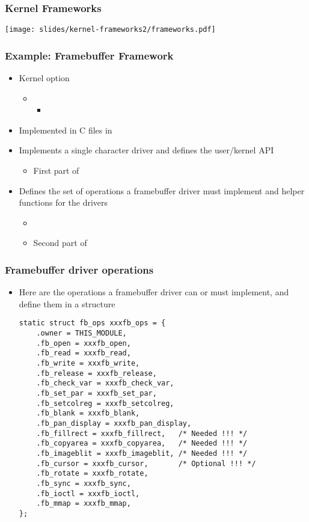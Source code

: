 \begin{frame}
  \frametitle{Kernel Frameworks}
  \begin{center}
    \texttt{[image: slides/kernel-frameworks2/frameworks.pdf]}
  \end{center}
\end{frame}

\begin{frame}
  \frametitle{Example: Framebuffer Framework}
  \begin{itemize}
  \item Kernel option 
    \begin{itemize}
    \item {}
      \begin{itemize}
      \item {}
      \end{itemize}
    \end{itemize}
  \item Implemented in C files in 
  \item Implements a single character driver and defines the
    user/kernel API
    \begin{itemize}
    \item First part of 
    \end{itemize}
  \item Defines the set of operations a framebuffer driver must
    implement and helper functions for the drivers
    \begin{itemize}
    \item {}
    \item Second part of 
    \end{itemize}
  \end{itemize}
\end{frame}

\begin{frame}[fragile]
  \frametitle{Framebuffer driver operations}
  \begin{itemize}
  \item Here are the operations a framebuffer driver can or must
  implement, and define them in a  structure
  \begin{verbatim}
static struct fb_ops xxxfb_ops = {
    .owner = THIS_MODULE,
    .fb_open = xxxfb_open,
    .fb_read = xxxfb_read,
    .fb_write = xxxfb_write,
    .fb_release = xxxfb_release,
    .fb_check_var = xxxfb_check_var,
    .fb_set_par = xxxfb_set_par,
    .fb_setcolreg = xxxfb_setcolreg,
    .fb_blank = xxxfb_blank,
    .fb_pan_display = xxxfb_pan_display,
    .fb_fillrect = xxxfb_fillrect,   /* Needed !!! */
    .fb_copyarea = xxxfb_copyarea,   /* Needed !!! */
    .fb_imageblit = xxxfb_imageblit, /* Needed !!! */
    .fb_cursor = xxxfb_cursor,       /* Optional !!! */
    .fb_rotate = xxxfb_rotate,
    .fb_sync = xxxfb_sync,
    .fb_ioctl = xxxfb_ioctl,
    .fb_mmap = xxxfb_mmap,
};
  \end{verbatim}
  \end{itemize}
\end{frame}

